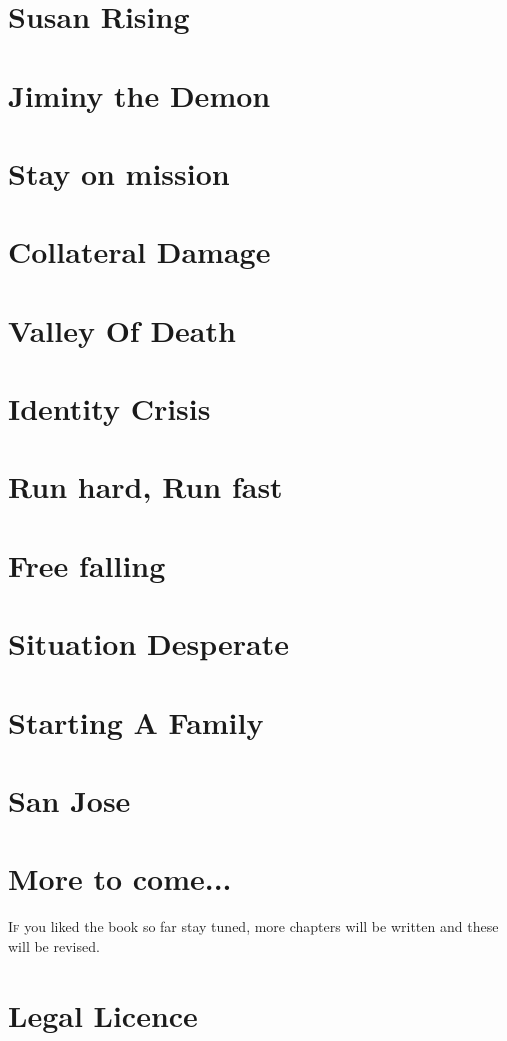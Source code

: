\chapter{Susan Rising}

\chapter{Jiminy the Demon}

\chapter{Stay on mission}

\chapter{Collateral Damage}

\chapter{Valley Of Death}

\chapter{Identity Crisis}

\chapter{Run hard, Run fast}

\chapter{Free falling}

\chapter{Situation Desperate}

\chapter{Starting A Family}

\chapter{San Jose}

%

\chapter{More to come...}
\lettrine[lines=2,lraise=0]{I}f you liked the book so far stay tuned, more chapters will be written and these will be revised.

\chapter{Legal Licence}

